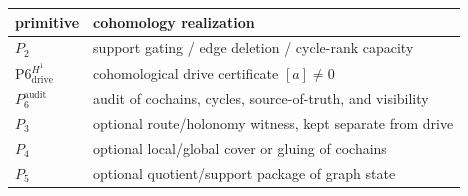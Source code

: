 \documentclass[11pt]{article}
\theoremstyle{definition}
\begin{document}
\begin{longtable}[]{@{}ll@{}}
\toprule
\begin{minipage}[b]{0.34\columnwidth}\raggedright
primitive\strut
\end{minipage} & \begin{minipage}[b]{0.60\columnwidth}\raggedright
cohomology realization\strut
\end{minipage}\tabularnewline
\midrule
\endhead
\begin{minipage}[t]{0.34\columnwidth}\raggedright
\(P_{2}\)\strut
\end{minipage} & \begin{minipage}[t]{0.60\columnwidth}\raggedright
support gating / edge deletion / cycle-rank capacity\strut
\end{minipage}\tabularnewline
\begin{minipage}[t]{0.34\columnwidth}\raggedright
\(\mathrm{P6}_{\mathrm{drive}}^{H^{1}}\)\strut
\end{minipage} & \begin{minipage}[t]{0.60\columnwidth}\raggedright
cohomological drive certificate \([a]\neq 0\)\strut
\end{minipage}\tabularnewline
\begin{minipage}[t]{0.34\columnwidth}\raggedright
\(P_{6}^{\mathrm{audit}}\)\strut
\end{minipage} & \begin{minipage}[t]{0.60\columnwidth}\raggedright
audit of cochains, cycles, source-of-truth, and visibility\strut
\end{minipage}\tabularnewline
\begin{minipage}[t]{0.34\columnwidth}\raggedright
\(P_{3}\)\strut
\end{minipage} & \begin{minipage}[t]{0.60\columnwidth}\raggedright
optional route/holonomy witness, kept separate from drive\strut
\end{minipage}\tabularnewline
\begin{minipage}[t]{0.34\columnwidth}\raggedright
\(P_{4}\)\strut
\end{minipage} & \begin{minipage}[t]{0.60\columnwidth}\raggedright
optional local/global cover or gluing of cochains\strut
\end{minipage}\tabularnewline
\begin{minipage}[t]{0.34\columnwidth}\raggedright
\(P_{5}\)\strut
\end{minipage} & \begin{minipage}[t]{0.60\columnwidth}\raggedright
optional quotient/support package of graph state\strut
\end{minipage}\tabularnewline
\bottomrule
\end{longtable}
\end{document}
